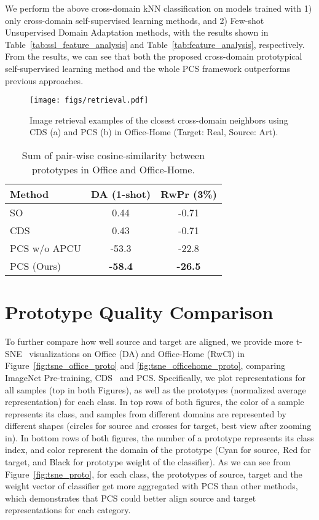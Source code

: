 \documentclass[final]{cvpr}
\newcommand{\Gd}{\rowcolor{gray!45}}
\begin{document}
We perform the above cross-domain kNN classification on models trained with 1) only cross-domain self-supervised learning methods, and 2) Few-shot Unsupervised Domain Adaptation methods, with the results shown in Table~\ref{tab:ssl_feature_analysis} and Table~\ref{tab:feature_analysis}, respectively. 
From the results, we can see that both the proposed cross-domain prototypical self-supervised learning method and the whole PCS framework outperforms previous approaches. 













\begin{figure*}[]
 \centering
 \texttt{[image: figs/retrieval.pdf]}
 \caption{Image retrieval examples of the closest cross-domain neighbors using CDS (a) and PCS (b) in Office-Home (Target: Real, Source: Art).}
 \label{fig:retrieval}
\end{figure*}


\begin{table}[t]
\centering
\caption{Sum of pair-wise cosine-similarity between prototypes in Office and Office-Home. }
\begin{tabular}{lcc}
\toprule
Method & DA (1-shot) & RwPr (3\%) \\ \midrule
SO & 0.44 & -0.71 \\
CDS~\cite{kim2020cross} & 0.43 & -0.71 \\
PCS w/o APCU & -53.3 & -22.8 \\
\Gd PCS (Ours) & \textbf{-58.4} & \textbf{-26.5} \\ \bottomrule
\end{tabular}
\label{tab:sum_distance}
\end{table}

\section{Prototype Quality Comparison}
To further compare how well source and target are aligned, we provide more t-SNE~\cite{maaten2008visualizing} visualizations on Office (DA) and Office-Home (RwCl) in Figure~\ref{fig:tsne_office_proto} and \ref{fig:tsne_officehome_proto}, comparing ImageNet Pre-training, CDS~\cite{kim2020cross} and PCS. Specifically, we plot representations for all samples (top in both Figures), as well as the prototypes (normalized average representation) for each class. In top rows of both figures, the color of a sample represents its class, and samples from different domains are represented by different shapes (circles for source and crosses for target, best view after zooming in). In bottom rows of both figures, the number of a prototype represents its class index, and color represent the domain of the prototype (Cyan for source, Red for target, and Black for prototype weight of the classifier). As we can see from Figure~\ref{fig:tsne_proto}, for each class, the prototypes of source, target and the weight vector of classifier get more aggregated with PCS than other methods, which demonstrates that PCS could better align source and target representations for each category. 
\end{document}
